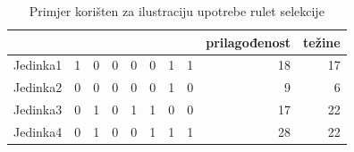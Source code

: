 \documentclass[b5paper, utf8, 11pt, colorlinks]{book}
\theoremstyle{definition}
\begin{document}
\begin{table}
	\centering
	\begin{tabular}{l|rrrrrrrrr}
		& \multicolumn{1}{l}{} & \multicolumn{1}{l}{} & \multicolumn{1}{l}{} & \multicolumn{1}{l}{} & \multicolumn{1}{l}{} & \multicolumn{1}{l}{} & \multicolumn{1}{l}{} & \multicolumn{1}{l}{prilagođenost} & \multicolumn{1}{l}{težine}  \\\hline
		Jedinka1 & 1                    & 0                    & 0                    & 0                    & 0                    & 1                    & 1                    & 18                         & 17                          \\
		Jedinka2 & 0                    & 0                    & 0                    & 0                    & 0                    & 1                    & 0                    & 9                          & 6                           \\
		Jedinka3 & 0                    & 1                    & 0                    & 1                    & 1                    & 0                    & 0                    & 17                         & 22                          \\
		Jedinka4 & 0                    & 1                    & 0                    & 0                    & 1                    & 1                    & 1                    & 28                         & 22      \\\hline                   
	\end{tabular}\caption{Primjer korišten za ilustraciju upotrebe rulet selekcije}
	\label{tab:rulet}
\end{table}
\end{document}
